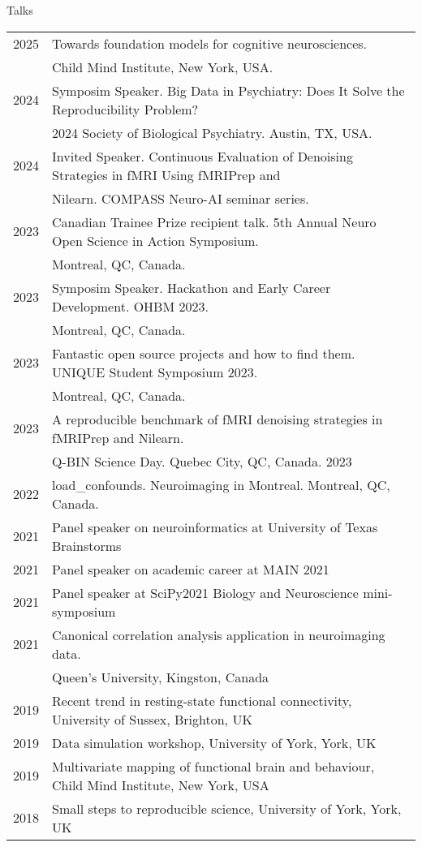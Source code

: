 \documentclass{resume} %
\begin{document}
\begin{rSection}{Talks}

  \begin{tabular}{@{} l l @{\hspace{10ex}}}
 	2025 & Towards foundation models for cognitive neurosciences. \\
 	&Child Mind Institute, New York, USA. \\
    2024 & Symposim Speaker. Big Data in Psychiatry: Does It Solve the Reproducibility Problem? \\ & 2024 Society of Biological Psychiatry. Austin, TX, USA.\\
    2024 & Invited Speaker. Continuous Evaluation of Denoising Strategies in fMRI Using fMRIPrep and\\
 	&Nilearn. COMPASS Neuro-AI seminar series.\\
    2023 & Canadian Trainee Prize recipient talk. 5th Annual Neuro Open Science in Action Symposium. \\ & Montreal, QC, Canada.\\
    2023 & Symposim Speaker. Hackathon and Early Career Development. OHBM 2023. \\&Montreal, QC, Canada.\\
    2023 & Fantastic open source projects and how to find them. UNIQUE Student Symposium 2023. \\&Montreal, QC, Canada.\\
    2023 & A reproducible benchmark of fMRI denoising strategies in fMRIPrep and Nilearn. \\ & Q-BIN Science Day. Quebec City, QC, Canada. 2023\\
   	2022 & load\_confounds. Neuroimaging in Montreal. Montreal, QC, Canada.\\
    2021 & Panel speaker on neuroinformatics at University of Texas Brainstorms\\
    2021 & Panel speaker on academic career at MAIN 2021\\
    2021 & Panel speaker at SciPy2021 Biology and Neuroscience mini-symposium\\
  	2021 & Canonical correlation analysis application in neuroimaging data. \\&Queen's University, Kingston, Canada\\
    2019 & Recent trend in resting-state functional connectivity, University of Sussex, Brighton, UK\\
    2019 & Data simulation workshop, University of York, York, UK\\
    2019 & Multivariate mapping of functional brain and behaviour, Child Mind Institute, New York, USA\\
    2018 & Small steps to reproducible science, University of York, York, UK\\
  \end{tabular}
\end{rSection}

\pagebreak
\end{document}

